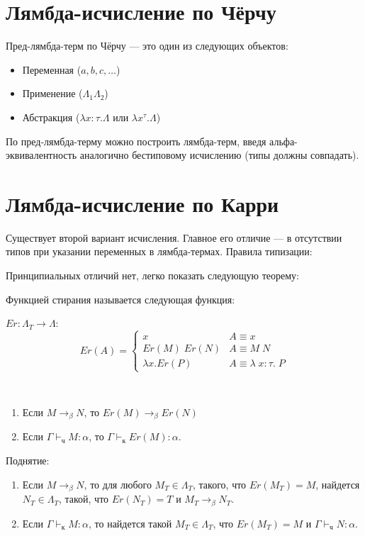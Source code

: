\section{Лямбда-исчисление по Чёрчу}

\begin{definition}Пред-лямбда-терм по Чёрчу --- это один из следующих объектов:
\begin{itemize}
\item Переменная ($a,b,c,\dots$)
\item Применение ($\Lambda_1 \Lambda_2$)
\item Абстракция ($\lambda x : \tau . \Lambda$ или $\lambda x^\tau . \Lambda$)
\end{itemize}
\end{definition}

По пред-лямбда-терму можно построить лямбда-терм, введя альфа-эквивалентность аналогично 
бестиповому исчислению (типы должны совпадать).

\section{Лямбда-исчисление по Карри}

Существует второй вариант исчисления.
Главное его отличие --- в отсутствии типов при указании переменных в лямбда-термах.
Правила типизации:
 
Принципиальных отличий нет, легко показать следующую теорему:

\begin{definition}[Стирание] Функцией стирания называется следующая функция: 
	
	$Er: \Lambda_T \rightarrow \Lambda$:
	\[
	Er (A) =
	\begin{cases}
	x                                   & A \equiv x \\
	Er(M) \; Er(N) & A \equiv M \; N \\
	\lambda x . Er(P)           & A \equiv \lambda \; x : \tau. \; P
	\end{cases}
	\]
\end{definition}

\begin{theorem} \
\begin{enumerate}
\item Если $M\rightarrow_\beta N$, то $Er(M)\rightarrow_\beta Er(N)$
\item Если $\Gamma\vdash_\texttt{ч} M:\alpha$, то $\Gamma\vdash_\texttt{к} Er(M):\alpha$.
\end{enumerate}

Поднятие:
\begin{enumerate}
\item Если $M\rightarrow_\beta N$, то для любого $M_T \in \Lambda_T$, такого, что $Er(M_T) = M$,
найдется $N_T \in \Lambda_T$, такой, что $Er(N_T) = T$ и $M_T \rightarrow_\beta N_T$.
\item Если $\Gamma\vdash_\texttt{к} M:\alpha$, то найдется такой $M_T\in\Lambda_T$, 
что $Er(M_T)=M$ и $\Gamma\vdash_\texttt{ч} N:\alpha$.
\end{enumerate}
\end{theorem}

